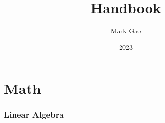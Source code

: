 \documentclass[10pt,a4paper,fleqn]{article} %
\begin{document}

\title{Handbook}
\author{Mark Gao}
\date{2023}
\maketitle

\newpage

\tableofcontents

\newpage


\part{Math}

\section{Linear Algebra} %
\end{document}
